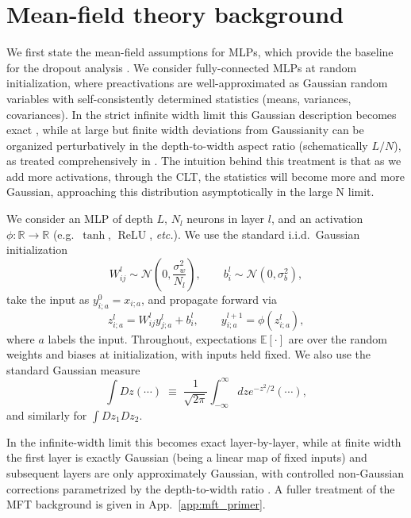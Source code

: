 \documentclass{article}
\DeclareMathOperator{\ReLU}{ReLU}
\newcommand{\relu}{\ensuremath{\ReLU}}
\theoremstyle{plain}
\theoremstyle{definition}
\theoremstyle{remark}
\begin{document}
\section{Mean-field theory background}
\label{sec:mft_background}
We first state the mean-field assumptions for MLPs, which provide the baseline for the dropout analysis \cite{poole2016exponentialexpressivitydeepneural,schoenholz2017deepinformationpropagation,Bahri2020StatMechDeepLearning,bahri2024leshoucheslecturesdeep}. We consider fully-connected MLPs at random initialization, where preactivations are well-approximated as Gaussian random variables with self-consistently determined statistics (means, variances, covariances). In the strict infinite width limit this Gaussian description becomes exact \cite{Lee2018DNNasGP}, while at large but finite width deviations from Gaussianity can be organized perturbatively in the depth-to-width aspect ratio (schematically $L/N$), as treated comprehensively in \cite{roberts2022principlesdeeplearningtheory,bahri2024leshoucheslecturesdeep}. The intuition behind this treatment is that as we add more activations, through the CLT, the statistics will become more and more Gaussian, approaching this distribution asymptotically in the large N limit. 

We consider an MLP of depth $L$, $N_l$ neurons in layer $l$, and an activation $\phi:\mathbb{R}\to\mathbb{R}$ (e.g.\ $\tanh$, \relu{}, \emph{etc.}). We use the standard i.i.d.\ Gaussian initialization
\relax
\begin{equation}
W^{l}_{ij}\sim \mathcal{N}\left(0,\frac{\sigma_{w}^{2}}{N_{l}}\right), \qquad b^{l}_{i}\sim \mathcal{N}\left(0,\sigma_{b}^{2}\right),
\end{equation}
\relax
take the input as $y^{0}_{i;a}=x_{i;a}$, and propagate forward via
\relax
\begin{equation}
z^{l}_{i;a}= W^{l}_{ij} y^{l}_{j;a}+b^{l}_{i}, \qquad y^{l+1}_{i;a}=\phi\left(z^{l}_{i;a}\right),
\end{equation}
\relax
where $a$ labels the input. Throughout, expectations $\mathbb{E}[\cdot]$ are over the random weights and biases at initialization, with inputs held fixed. We also use the standard Gaussian measure
\relax
\begin{equation}
\int Dz (\cdots)\;\equiv\;\frac{1}{\sqrt{2\pi}}\int_{-\infty}^{\infty}dz e^{-z^{2}/2}(\cdots),
\end{equation}
\relax
and similarly for $\int Dz_1 Dz_2$.

In the infinite-width limit this becomes exact layer-by-layer, while at finite width the first layer is exactly Gaussian (being a linear map of fixed inputs) and subsequent layers are only approximately Gaussian, with controlled non-Gaussian corrections parametrized by the depth-to-width ratio \cite{roberts2022principlesdeeplearningtheory}. A fuller treatment of the MFT background is given in App.~\ref{app:mft_primer}. 
\end{document}
